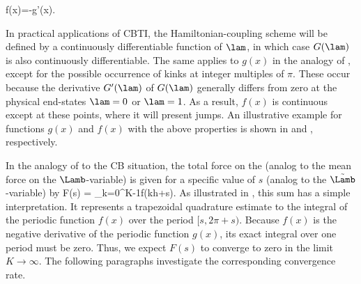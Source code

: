         f(x)=-g'(x).
        \eeq

In practical applications of CBTI, the Hamiltonian-coupling scheme 
will 
be defined by a continuously differentiable function of $\lam$, in which case $G(\lam)$ is also continuously differentiable. The same applies to $g(x)$ in the analogy of , except for the possible occurrence of kinks at integer multiples of $\pi$. These occur because the derivative $G'(\lam)$ of $G(\lam)$ generally differs from zero at the physical end-states $\lam=0$ or $\lam=1$. As a result, $f(x)$ is continuous except at these points, where it will present jumps. An illustrative example for functions $g(x)$ and $f(x)$ with the above properties is shown in  and , respectively.

In the analogy of  to the CB situation, the total force on the  (analog to the mean force on the $\Lamb$-variable) is given for a specific value of $s$ (analog to the $\tilde{\Lamb}$-variable) by 
%
F(s) = \sum\limits_{k=0}^{K-1}f(kh+s).
\eeq
%
As illustrated in , this sum has a simple interpretation. It represents a trapezoidal quadrature
estimate to the integral of the periodic function $f(x)$ over the period $[s,2\pi+s)$. Because $f(x)$ is the negative derivative of the periodic function $g(x)$, its exact integral over one period must be zero. Thus,  we expect $F(s)$ to converge to zero in the limit $K\rightarrow \infty$. The following paragraphs investigate the corresponding convergence rate.
%
 
